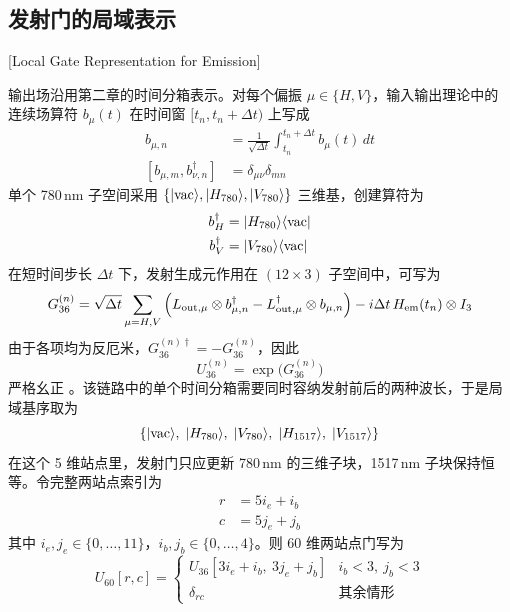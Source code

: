 \subsection{发射门的局域表示}[Local Gate Representation for Emission]

输出场沿用第二章的时间分箱表示。对每个偏振 $\mu\in\{H,V\}$，输入输出理论中的连续场算符 $b_\mu(t)$ 在时间窗 $[t_n,t_n+\Delta t)$ 上写成 \cite{GardinerCollett1985}
\begin{align}
b_{\mu,n} &= \frac{1}{\sqrt{\Delta t}}\int_{t_n}^{t_n+\Delta t}b_\mu(t)\,dt\\
[b_{\mu,m},b_{\nu,n}^\dagger] &= \delta_{\mu\nu}\delta_{mn}
\end{align}
单个 780\,nm 子空间采用 $\{|{\rm vac}\rangle,|H_{780}\rangle,|V_{780}\rangle\}$ 三维基，创建算符为
\begin{align}
b_H^\dagger &= |H_{780}\rangle\langle {\rm vac}|\\
b_V^\dagger &= |V_{780}\rangle\langle {\rm vac}|
\end{align}
在短时间步长 $\Delta t$ 下，发射生成元作用在 $(12\times3)$ 子空间中，可写为
\begin{equation}
G_{36}^{(n)}=
\sqrt{\Delta t}\sum_{\mu=H,V}
\left(
L_{{\rm out},\mu}\otimes b_{\mu,n}^\dagger
-L_{{\rm out},\mu}^\dagger\otimes b_{\mu,n}
\right)
-i\Delta t\,H_{\mathrm{em}}(t_n)\otimes I_3
\label{eq:g36-emission}
\end{equation}
由于各项均为反厄米，$G_{36}^{(n)\dagger}=-G_{36}^{(n)}$，因此
\begin{equation}
U_{36}^{(n)}=\exp\!\bigl(G_{36}^{(n)}\bigr)
\label{eq:u36-emission}
\end{equation}
严格幺正 \cite{Pichler2016TimeDelaysMPS,Guimond2017DelayedCoherentFeedbackMPS}。该链路中的单个时间分箱需要同时容纳发射前后的两种波长，于是局域基序取为
\begin{equation}
\{|{\rm vac}\rangle,\;|H_{780}\rangle,\;|V_{780}\rangle,\;|H_{1517}\rangle,\;|V_{1517}\rangle\}
\label{eq:bin5d-basis}
\end{equation}
在这个 5 维站点里，发射门只应更新 780\,nm 的三维子块，1517\,nm 子块保持恒等。令完整两站点索引为
\begin{align}
r &= 5i_e+i_b\\
c &= 5j_e+j_b
\end{align}
其中 $i_e,j_e\in\{0,\dots,11\}$，$i_b,j_b\in\{0,\dots,4\}$。则 60 维两站点门写为
\begin{equation}
U_{60}[r,c]=
\begin{cases}
U_{36}[3i_e+i_b,\ 3j_e+j_b] & i_b<3,\ j_b<3\\
\delta_{rc} & \text{其余情形}
\end{cases}
\label{eq:app-u60-piecewise}
\end{equation}
